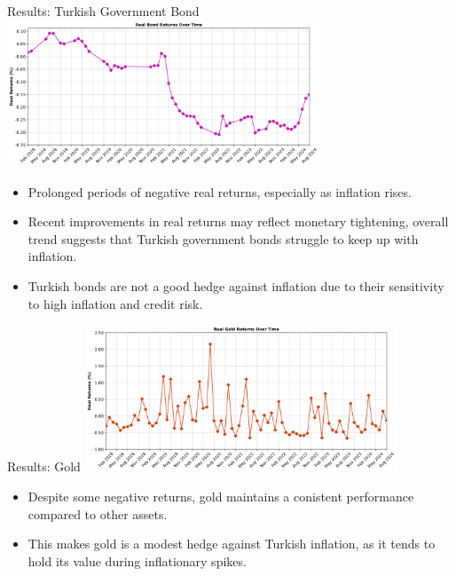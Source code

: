 \documentclass{beamer}
\begin{document}
\begin{frame}{Results: Turkish Government Bond}
\includegraphics[width=0.7\textwidth]{real_bond_returns.png}
\begin{itemize}
\item Prolonged periods of negative real returns, especially as inflation rises.
\item Recent improvements in real returns may reflect monetary tightening, overall trend suggests that Turkish government bonds struggle to keep up with inflation.
\item Turkish bonds are not a good hedge against inflation due to their sensitivity to high inflation and credit risk.
\end{itemize}
\end{frame}

\begin{frame}{Results: Gold}
\includegraphics[width=0.7\textwidth]{real_gold_returns.png}
\begin{itemize}
\item Despite some negative returns, gold maintains a conistent performance compared to other assets.
\item This makes gold is a modest hedge against Turkish inflation, as it tends to hold its value during inflationary spikes. 
\end{itemize}
\end{frame}
\end{document}
